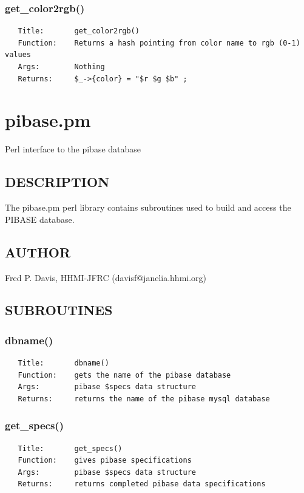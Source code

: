 \documentclass{article}
\begin{document}
\subsubsection*{get\_color2rgb()\label{LGL_pm_get_color2rgb_}}
\begin{verbatim}
   Title:       get_color2rgb()
   Function:    Returns a hash pointing from color name to rgb (0-1) values
   Args:        Nothing
   Returns:     $_->{color} = "$r $g $b" ;
\end{verbatim}
\clearpage
\section{pibase.pm\label{pibase_pm}}


Perl interface to the pibase database

\subsection*{DESCRIPTION\label{pibase_pm_DESCRIPTION}}


The pibase.pm perl library contains subroutines used to build and access the
PIBASE database.

\subsection*{AUTHOR\label{pibase_pm_AUTHOR}}


Fred P. Davis, HHMI-JFRC (davisf@janelia.hhmi.org)

\subsection*{SUBROUTINES\label{pibase_pm_SUBROUTINES}}
\subsubsection*{dbname()\label{pibase_pm_dbname_}}
\begin{verbatim}
   Title:       dbname()
   Function:    gets the name of the pibase database
   Args:        pibase $specs data structure
   Returns:     returns the name of the pibase mysql database
\end{verbatim}
\subsubsection*{get\_specs()\label{pibase_pm_get_specs_}}
\begin{verbatim}
   Title:       get_specs()
   Function:    gives pibase specifications
   Args:        pibase $specs data structure
   Returns:     returns completed pibase data specifications
\end{verbatim}
\end{document}
